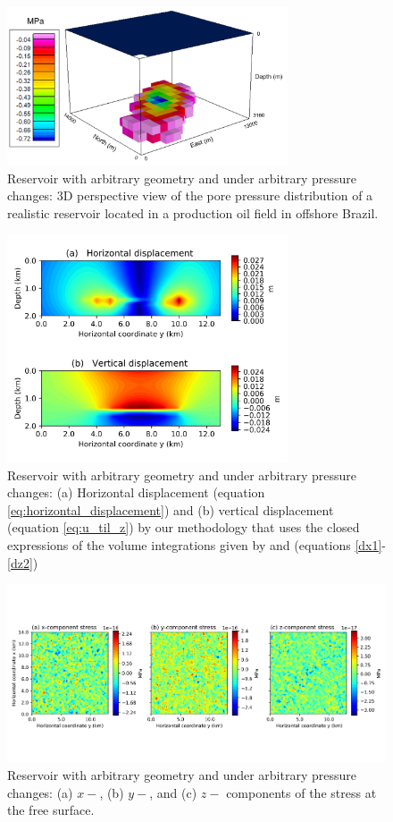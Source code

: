 \documentclass[journal abbreviation, manuscript]{copernicus}
\begin{document}


\begin{figure}[h]
\includegraphics[width=8.3cm]{Fig/Figure_Pressure_complex_reservoir.png}
\caption{Reservoir with arbitrary geometry and under arbitrary pressure changes: 3D perspective view of the pore pressure distribution of a realistic reservoir 
located in a production oil field in offshore Brazil.}
\label{fig:pressure_complex_reservoir}
\end{figure}

\begin{figure}[h]
\includegraphics[width=8.3cm]{Fig/Figure_Displacement_complex_reservoir.png}
\caption{Reservoir with arbitrary geometry and under arbitrary pressure changes: (a) Horizontal displacement (equation \ref{eq:horizontal_displacement}) and (b) vertical displacement (equation \ref{eq:u_til_z}) by our methodology that uses the closed expressions of the volume integrations given by \cite{Nagyetal2000} and \cite{Nagyetal2002} (equations \ref{dx1}-\ref{dz2})}
\label{fig:displacement_complex_reservoir}
\end{figure}

\begin{figure}[h]
\includegraphics[width=12cm]{Fig/Figure_Null_stress_complex_reservoir.png}
\caption{Reservoir with arbitrary geometry and under arbitrary pressure changes: (a) $x-$, (b) $y-$, and (c) $z-$ components of the stress at the free surface.}
\label{fig:Null_stress_complex_reservoir}
\end{figure}
\end{document}
